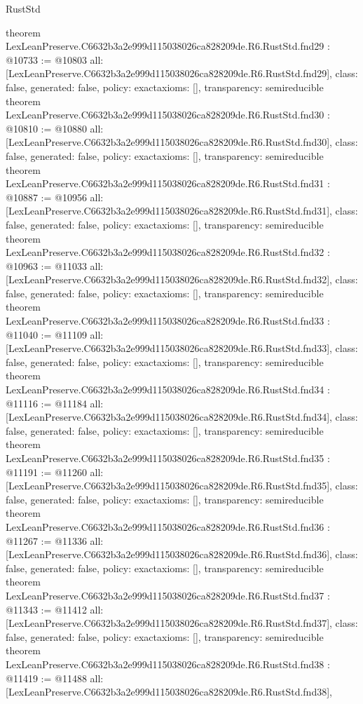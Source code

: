 \begin{lexlean}{RustStd}
\begin{coremodule}
{}
theorem LexLeanPreserve.C6632b3a2e999d115038026ca828209de.R6.RustStd.fnd29 : @10733 := @10803 {
  all: [LexLeanPreserve.C6632b3a2e999d115038026ca828209de.R6.RustStd.fnd29],
  class: false,
  generated: false,
  policy: exact{axioms: []},
  transparency: semireducible
}
theorem LexLeanPreserve.C6632b3a2e999d115038026ca828209de.R6.RustStd.fnd30 : @10810 := @10880 {
  all: [LexLeanPreserve.C6632b3a2e999d115038026ca828209de.R6.RustStd.fnd30],
  class: false,
  generated: false,
  policy: exact{axioms: []},
  transparency: semireducible
}
theorem LexLeanPreserve.C6632b3a2e999d115038026ca828209de.R6.RustStd.fnd31 : @10887 := @10956 {
  all: [LexLeanPreserve.C6632b3a2e999d115038026ca828209de.R6.RustStd.fnd31],
  class: false,
  generated: false,
  policy: exact{axioms: []},
  transparency: semireducible
}
theorem LexLeanPreserve.C6632b3a2e999d115038026ca828209de.R6.RustStd.fnd32 : @10963 := @11033 {
  all: [LexLeanPreserve.C6632b3a2e999d115038026ca828209de.R6.RustStd.fnd32],
  class: false,
  generated: false,
  policy: exact{axioms: []},
  transparency: semireducible
}
theorem LexLeanPreserve.C6632b3a2e999d115038026ca828209de.R6.RustStd.fnd33 : @11040 := @11109 {
  all: [LexLeanPreserve.C6632b3a2e999d115038026ca828209de.R6.RustStd.fnd33],
  class: false,
  generated: false,
  policy: exact{axioms: []},
  transparency: semireducible
}
theorem LexLeanPreserve.C6632b3a2e999d115038026ca828209de.R6.RustStd.fnd34 : @11116 := @11184 {
  all: [LexLeanPreserve.C6632b3a2e999d115038026ca828209de.R6.RustStd.fnd34],
  class: false,
  generated: false,
  policy: exact{axioms: []},
  transparency: semireducible
}
theorem LexLeanPreserve.C6632b3a2e999d115038026ca828209de.R6.RustStd.fnd35 : @11191 := @11260 {
  all: [LexLeanPreserve.C6632b3a2e999d115038026ca828209de.R6.RustStd.fnd35],
  class: false,
  generated: false,
  policy: exact{axioms: []},
  transparency: semireducible
}
theorem LexLeanPreserve.C6632b3a2e999d115038026ca828209de.R6.RustStd.fnd36 : @11267 := @11336 {
  all: [LexLeanPreserve.C6632b3a2e999d115038026ca828209de.R6.RustStd.fnd36],
  class: false,
  generated: false,
  policy: exact{axioms: []},
  transparency: semireducible
}
theorem LexLeanPreserve.C6632b3a2e999d115038026ca828209de.R6.RustStd.fnd37 : @11343 := @11412 {
  all: [LexLeanPreserve.C6632b3a2e999d115038026ca828209de.R6.RustStd.fnd37],
  class: false,
  generated: false,
  policy: exact{axioms: []},
  transparency: semireducible
}
theorem LexLeanPreserve.C6632b3a2e999d115038026ca828209de.R6.RustStd.fnd38 : @11419 := @11488 {
  all: [LexLeanPreserve.C6632b3a2e999d115038026ca828209de.R6.RustStd.fnd38],
}
\end{coremodule}
\end{lexlean}
